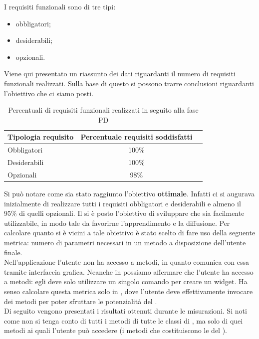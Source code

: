 				I requisiti funzionali sono di tre tipi:
				\begin{itemize}
					\item obbligatori;
					\item desiderabili;
					\item opzionali.
				\end{itemize}
				Viene qui presentato un riassunto dei dati riguardanti il numero di requisiti funzionali realizzati. Sulla base di questo si possono trarre conclusioni riguardanti l'obiettivo che ci siamo posti.
				\begin{table}[H]
					\centering
					\begin{tabu}{| l | c | c |}
						\hline
						Tipologia requisito   & Percentuale requisiti soddisfatti \\ \hline \hline
						Obbligatori           & 100\% \\ \hline
						Desiderabili          & 100\% \\ \hline
						Opzionali             & 98\% \\ \hline
					\end{tabu}
					\caption{Percentuali di requisiti funzionali realizzati in seguito alla fase PD}
				\end{table}
				Si può notare come sia stato raggiunto l'obiettivo \textbf{ottimale}. Infatti ci si augurava inizialmente di realizzare tutti i requisiti obbligatori e desiderabili e almeno il 95\% di quelli opzionali.
				Il \groupname si è posto l'obiettivo di sviluppare  che sia facilmente utilizzabile, in modo tale da favorirne l'apprendimento e la diffusione. Per calcolare quanto si è vicini a tale obiettivo è stato scelto di fare uso della seguente metrica: numero di parametri necessari in un metodo a disposizione dell'utente finale.\\
				Nell'applicazione  l'utente non ha accesso a metodi, in quanto comunica con essa tramite interfaccia grafica. Neanche in  possiamo affermare che l'utente ha accesso a metodi: egli deve solo utilizzare un singolo comando per creare un widget. Ha senso calcolare questa metrica solo in , dove l'utente deve effettivamente invocare dei metodi per poter sfruttare le potenzialità del .\\
				Di seguito vengono presentati i risultati ottenuti durante le misurazioni. Si noti come non si tenga conto di tutti i metodi di tutte le classi di , ma solo di quei metodi ai quali l'utente può accedere (i metodi che costituiscono le  del ).\\
